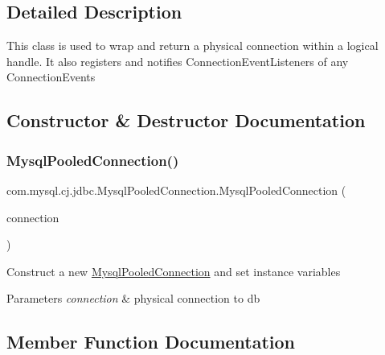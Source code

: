 \subsection{Detailed Description}
This class is used to wrap and return a physical connection within a logical handle. It also registers and notifies Connection\+Event\+Listeners of any Connection\+Events 

\subsection{Constructor \& Destructor Documentation}
\mbox{\label{classcom_1_1mysql_1_1cj_1_1jdbc_1_1_mysql_pooled_connection_a43cdb60be4556fa920df1f9825251e34}} 
\subsubsection{\texorpdfstring{Mysql\+Pooled\+Connection()}{MysqlPooledConnection()}}
{\footnotesize\ttfamily com.\+mysql.\+cj.\+jdbc.\+Mysql\+Pooled\+Connection.\+Mysql\+Pooled\+Connection (\begin{DoxyParamCaption}\item[{\mbox{\hyperlink{interfacecom_1_1mysql_1_1cj_1_1jdbc_1_1_jdbc_connection}{com.\+mysql.\+cj.\+jdbc.\+Jdbc\+Connection}}}]{connection }\end{DoxyParamCaption})}

Construct a new \mbox{\hyperlink{classcom_1_1mysql_1_1cj_1_1jdbc_1_1_mysql_pooled_connection}{Mysql\+Pooled\+Connection}} and set instance variables


\begin{DoxyParams}{Parameters}
{\em connection} & physical connection to db \\
\hline
\end{DoxyParams}


\subsection{Member Function Documentation}
\mbox{\label{classcom_1_1mysql_1_1cj_1_1jdbc_1_1_mysql_pooled_connection_a78b602d37e0fa7a264bf701a20b0a524}} 
